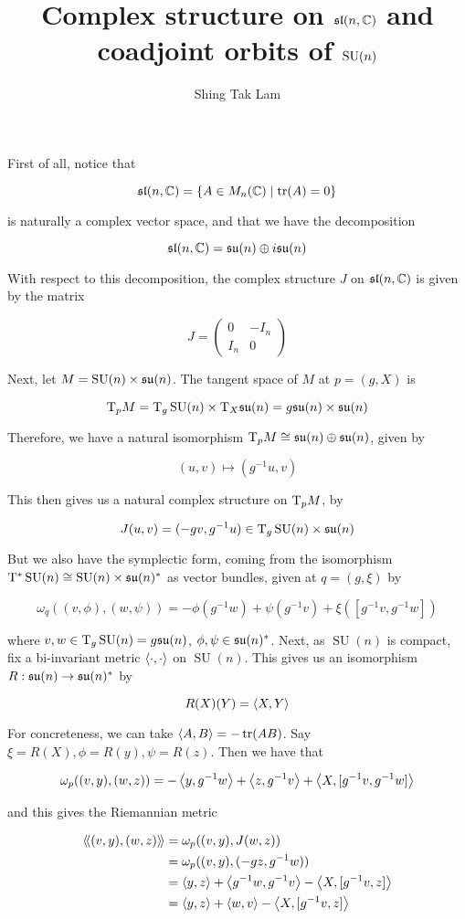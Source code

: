 \documentclass{article}
\title{Complex structure on \(\sl(n, \C)\) and coadjoint orbits of \(\SU(n)\)}
\author{Shing Tak Lam}
\DeclareMathOperator{\SU}{SU}
\renewcommand{\sl}{\mfs\mfl}
\newcommand{\su}{\mfs\mfu}
\newcommand{\iinner}[1]{\left\langle\!\left\langle #1 \right\rangle\!\right\rangle}
\begin{document}
\maketitle

First of all, notice that

\[\sl(n, \C) = \{A \in M_n(\C) \mid \tr(A) = 0\}\]

is naturally a complex vector space, and that we have the decomposition

\[\sl(n, \C) = \su(n) \oplus i \su(n)\]

With respect to this decomposition, the complex structure \(J\) on \(\sl(n, \C)\) is given by the matrix

\[J = \begin{pmatrix}
    0 & -I_n \\
    I_n & 0
\end{pmatrix}\]

Next, let \(M = \SU(n) \times \su(n)\). The tangent space of \(M\) at \(p = (g, X)\) is

\[\TT_pM = \TT_g\SU(n) \times \TT_X\su(n) = g\su(n) \times \su(n)\]

Therefore, we have a natural isomorphism \(\TT_pM \cong \su(n) \oplus \su(n)\), given by

\[(u, v) \mapsto (g^{-1}u, v)\]

This then gives us a natural complex structure on \(\mathrm{T}_pM\), by

\[J(u, v) = (-gv, g^{-1}u) \in \TT_g\SU(n) \times \su(n)\]

But we also have the symplectic form, coming from the isomorphism \(\TT^* \SU(n) \cong \SU(n) \times \su(n)^*\) as vector bundles, given at \(q = (g, \xi)\) by

\[\omega_q((v, \phi), (w, \psi)) = -\phi(g^{-1}w) + \psi(g^{-1}v)+\xi([g^{-1}v, g^{-1}w])\]

where \(v, w \in \TT_g\SU(n) = g\su(n)\), \(\phi, \psi \in \su(n)^*\). Next, as \(\SU(n)\) is compact, fix a bi-invariant metric \(\left\langle \cdot, \cdot \right\rangle\) on \(\SU(n)\). This gives us an isomorphism \(R : \su(n) \to \su(n)^*\) by

\[R(X)(Y) = \left\langle X, Y \right\rangle\]

For concreteness, we can take \(\left\langle A, B \right\rangle = -\tr(AB)\). Say \(\xi = R(X), \phi = R(y), \psi = R(z)\). Then we have that

\[\omega_p((v, y), (w, z)) = -\left\langle y, g^{-1}w \right\rangle + \left\langle z, g^{-1}v \right\rangle + \left\langle X, [g^{-1}v, g^{-1}w] \right\rangle\]

and this gives the Riemannian metric

\begin{align*}
    \iinner{(v, y), (w, z)} &= \omega_p((v, y), J(w, z)) \\
    &= \omega_p((v, y), (-gz, g^{-1}w)) \\
    &= \inner{y, z} + \inner{g^{-1}w, g^{-1}v} - \inner{X, [g^{-1}v, z]} \\
    &= \inner{y, z} + \inner{w, v} - \inner{X, [g^{-1}v, z]}
\end{align*}
\end{document}
